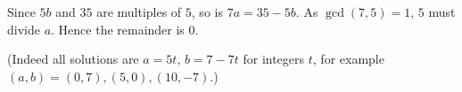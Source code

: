 Since $5b$ and $35$ are multiples of $5$, so is $7a=35-5b$. As $\gcd(7,5)=1$, $5$ must divide $a$. Hence the remainder is $\boxed{0}$.

(Indeed all solutions are $a=5t$, $b=7-7t$ for integers $t$, for example $(a,b)=(0,7),(5,0),(10,-7)$.)
